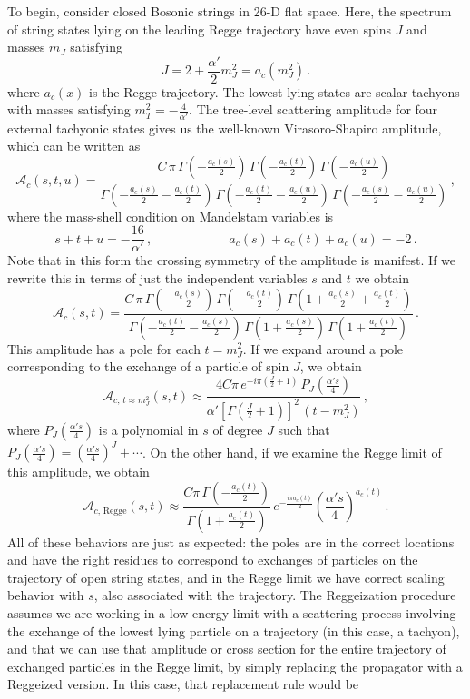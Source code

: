\documentclass[aps, prd, preprintnumbers, floatfix, showpacs, showkeys, nofootinbib, 10pt]{revtex4-1}
\def\beq{\begin{equation}}
\def\eeq{\end{equation}}
\begin{document}
To begin, consider closed Bosonic strings in 26-D flat space.  Here, the spectrum of string states lying on the leading Regge trajectory have even spins $J$ and masses $m_J$ satisfying
\beq
J = 2 + \frac{\alpha'}{2}m_J^2 = a_c(m_J^2) \, .
\eeq
where $a_c(x)$ is the Regge trajectory.  The lowest lying states are scalar tachyons with masses satisfying $m_T^2 = -\frac{4}{\alpha'}$.  The tree-level scattering amplitude for four external tachyonic states gives us the well-known Virasoro-Shapiro amplitude, which can be written as
\beq
\label{eqn:VSoriginal}
\mathcal{A}_{c}(s, t, u) = \frac{C \, \pi \, \Gamma\left(-\frac{a_c(s)}{2}\right) \, \Gamma\left(-\frac{a_c(t)}{2}\right) \, \Gamma\left(-\frac{a_c(u)}{2}\right)}{\Gamma\left(-\frac{a_c(s)}{2} - \frac{a_c(t)}{2}\right) \, \Gamma\left(-\frac{a_c(t)}{2} - \frac{a_c(u)}{2}\right) \, \Gamma\left(-\frac{a_c(s)}{2} - \frac{a_c(u)}{2}\right)} \, ,
\eeq
where the mass-shell condition on Mandelstam variables is
\beq
\label{eqn:BSMS}
s + t + u = -\frac{16}{\alpha'} \, , \hspace{1in} a_c(s) + a_c(t) + a_c(u) = -2 \, .
\eeq
Note that in this form the crossing symmetry of the amplitude is manifest.  If we rewrite this in terms of just the independent variables $s$ and $t$ we obtain
\beq
\label{eqn:BSVSts}
\mathcal{A}_{c}(s, t) = \frac{C \, \pi \, \Gamma\left(-\frac{a_c(s)}{2}\right) \, \Gamma\left(-\frac{a_c(t)}{2}\right) \, \Gamma\left(1 + \frac{a_c(s)}{2} + \frac{a_c(t)}{2}\right)}{\Gamma\left(-\frac{a_c(t)}{2} - \frac{a_c(s)}{2}\right) \, \Gamma\left(1 +  \frac{a_c(s)}{2}\right) \, \Gamma\left(1 + \frac{a_c(t)}{2}\right)} \, .
\eeq
This amplitude has a pole for each $t = m_J^2$.  If we expand around a pole corresponding to the exchange of a particle of spin $J$, we obtain
\beq
\mathcal{A}_{c, \, t \approx m_J^2}(s, t) \approx \frac{4C\pi \, e^{-i\pi\left(\frac{J}{2} + 1\right)} \, P_J\left(\frac{\alpha' s}{4}\right)}{\alpha'\left[\Gamma\left(\frac{J}{2} + 1\right)\right]^2 \, (t - m_J^2) } \, ,
\eeq
where $P_J\left(\frac{\alpha' s}{4}\right)$ is a polynomial in $s$ of degree $J$ such that $P_J\left(\frac{\alpha' s}{4}\right) = \left(\frac{\alpha' s}{4}\right)^J + \cdots$.  On the other hand, if we examine the Regge limit of this amplitude, we obtain
\beq
\mathcal{A}_{c, \, \mathrm{Regge}}(s, t) \approx \frac{C\pi \, \Gamma\left(-\frac{a_c(t)}{2}\right)}{\Gamma\left(1 + \frac{a_c(t)}{2}\right)} \, e^{-\frac{i\pi a_c(t)}{2}}\left(\frac{\alpha' s}{4}\right)^{a_c(t)} \, .
\eeq
All of these behaviors are just as expected:  the poles are in the correct locations and have the right residues to correspond to exchanges of particles on the trajectory of open string states, and in the Regge limit we have correct scaling behavior with $s$, also associated with the trajectory.  The Reggeization procedure assumes we are working in a low energy limit with a scattering process involving the exchange of the lowest lying particle on a trajectory (in this case, a tachyon), and that we can use that amplitude or cross section for the entire trajectory of exchanged particles in the Regge limit, by simply replacing the propagator with a Reggeized version.  In this case, that replacement rule would be
\end{document}
